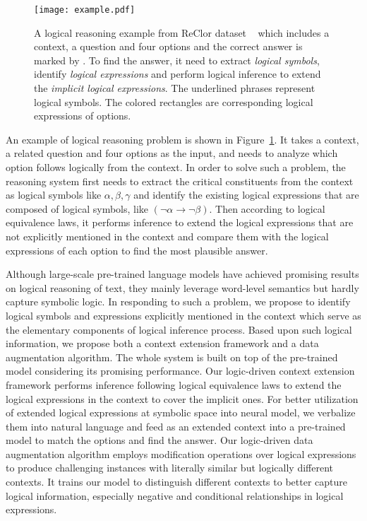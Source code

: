 \documentclass[11pt,a4paper]{article}
\begin{document}
\begin{figure}[!th]
\centering
\texttt{[image: example.pdf]}
\caption{\label{figure1} A logical reasoning example from ReClor dataset ~\cite{yu2020reclor} which includes a context, a question and four options and the correct answer is marked by \textcolor[RGB]{74,163,87}{\checkmark}. To find the answer, it need to extract \emph{logical symbols}, identify \emph{logical expressions} and perform logical inference to extend the \emph{implicit logical expressions}. The underlined phrases represent logical symbols. The colored rectangles are corresponding logical expressions of options.}
\end{figure}
An example of logical reasoning problem is shown in Figure~\ref{figure1}. It takes a context, a related question and four options as the input, and needs to analyze which option follows logically from the context.
In order to solve such a problem, the reasoning system first needs to extract the critical constituents from the context as logical symbols like $\alpha, \beta, \gamma$ and identify the existing logical expressions that are composed of logical symbols, like $(\neg \alpha \rightarrow \neg \beta)$.
Then according to logical equivalence laws, it performs inference to extend the logical expressions that are not explicitly mentioned in the context and compare them with the logical expressions of each option to find
the most plausible answer.








Although large-scale pre-trained language models \cite{devlin2019bert, liu2019roberta, yang2019xlnet} have achieved promising results on logical reasoning of text, they mainly leverage word-level semantics but hardly capture symbolic logic.
In responding to such a problem, we propose to identify logical symbols and expressions explicitly mentioned in the context which serve as the elementary components of logical inference process.
Based upon such logical information, we propose both a context extension framework and a data augmentation algorithm. 
The whole system is built on top of the pre-trained model considering its promising performance.
Our logic-driven context extension framework performs inference following logical equivalence laws to extend the logical expressions in the context to cover the implicit ones.
For better utilization of extended logical expressions at symbolic space into neural model, we verbalize them into natural language and feed as an extended context into a pre-trained model to match the options and find the answer.
Our logic-driven data augmentation algorithm employs modification operations over logical expressions to produce challenging instances with literally similar but logically different contexts. It trains our model to distinguish different contexts to better capture logical information, especially negative and conditional relationships in logical expressions.
\end{document}
